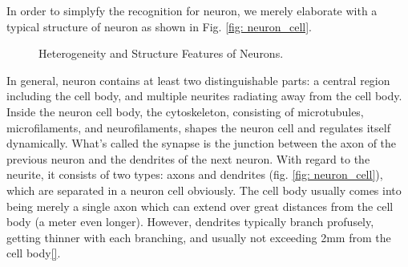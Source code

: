 \documentclass[journal,comsoc]{IEEEtran}
\begin{document}
	In order to simplyfy the recognition for neuron, we merely elaborate with a typical structure of neuron as shown in Fig. \ref{fig: neuron_cell}.
	\begin{figure}[htbp]
		\centering
		\caption{Heterogeneity and Structure Features of Neurons.}
	\end{figure}
	
	In general, neuron contains  at least two distinguishable parts: 
	a central region including the cell body, and multiple neurites radiating away from the cell body. 
	Inside the neuron cell body, the cytoskeleton, consisting of microtubules, microfilaments, and neurofilaments, shapes the neuron cell and regulates itself dynamically. 
	What's called the synapse is the junction between the axon of the previous neuron and the dendrites of the next neuron.
	With regard to the neurite, it consists of two types: axons and dendrites (fig. \ref{fig: neuron_cell}), which are separated in a neuron cell obviously.
	The cell body usually comes into being merely a single axon which can extend over great distances from the cell body (a meter even longer).
	However, dendrites typically branch profusely, getting thinner with each branching, and usually not exceeding 2mm from the cell body\ref{}.
	
\end{document}
